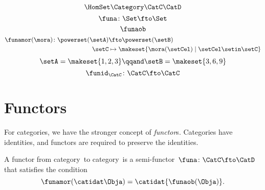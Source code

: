 {\begin{forslides}
\begin{equation}
            \label{eq:slides_hom}
            \HomSet\Category\CatC\CatD
        \end{equation}
        \begin{equation}
            \label{eq:pow_fun_1}
            \funa\colon \Set \fto \Set
        \end{equation}
        \begin{equation}
            \label{eq:pow_fun_2}
            \funaob
        \end{equation}
        \begin{equation}
            \label{eq:pow_fun_3}
            \begin{aligned}
                \funamor(\mora)\colon \powerset(\setA) & \fto \powerset(\setB) \\
                \setC                                  & \mapsto \makeset{ \mora(\setCel) \mid \setCel \setin \setC}
            \end{aligned}
        \end{equation}
        \begin{equation}
            \label{eq:pow_fun_4}
            \setA=\makeset{ 1,2,3} \qqand \setB=\makeset{3,6,9}
        \end{equation}
        \begin{equation}
            \label{eq:idfun}
            \funid_\CatC \colon \CatC \fto \CatC
        \end{equation}
    \end{forslides}
}

\section{Functors}

For categories, we have the stronger concept of \emph{functor}s.
Categories have identities, and functors are required to preserve the identities.

\begin{ctdefinition}
    \label{def:functor}
    A functor from category~\CatC to category~\CatD is a semi-functor~$\funa\colon \CatC \fto \CatD$
    that satisfies the condition
    \begin{equation}
        \label{eq:functor-condition}
        \funamor(\catidat\Obja)=\catidat{\funaob(\Obja)}.
    \end{equation}
\end{ctdefinition}

